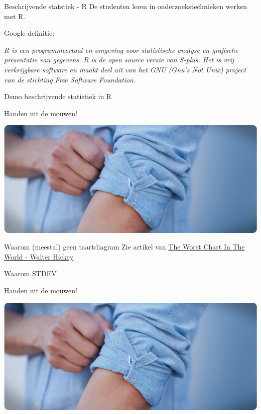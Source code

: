 \begin{frame}{Beschrijvende statstiek - R}
	De studenten leren in onderzoekstechnieken werken met R.
	
	Google definitie: 
	\begin{center}
		\textit{R is een programmeertaal en omgeving voor statistische analyse en grafische presentatie van gegevens. R is de open source versie van S-plus. Het is vrij verkrijgbare software en maakt deel uit van het GNU (Gnu's Not Unix) project van de stichting Free Software Foundation.}
	\end{center}
\end{frame}

\begin{frame}{Demo beschrijvende statistiek in R}
\begin{center}
		Handen uit de mouwen! 
\end{center}
\includegraphics[width=\textwidth]{img/handen.png}
\end{frame}

\begin{frame}{Waarom (meestal) geen taartdiagram}
	Zie artikel van \href{http://www.businessinsider.com/pie-charts-are-the-worst-2013-6?IR=T}{The Worst Chart In The World - Walter Hickey}
\end{frame}

\begin{frame}{Waarom STDEV}
	\begin{center}
		Handen uit de mouwen! 
	\end{center}
	\includegraphics[width=\textwidth]{img/handen.png}
\end{frame}

